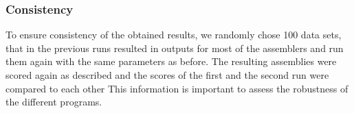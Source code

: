 \documentclass{bmcart}
\begin{document}
\subsubsection*{Consistency}
To ensure consistency of the obtained results, we randomly chose  \num{100} data sets, that in the previous runs resulted in outputs for most of the assemblers and run them again with the same parameters as before.
The resulting assemblies were scored again as described and the scores of the first and the second run were compared to each other
This information is important to assess the robustness of the different programs.

\end{document}
